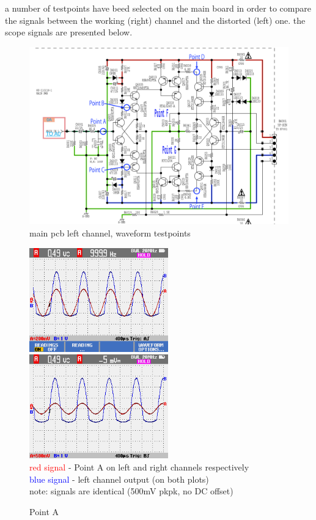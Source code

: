 \documentclass[a4paper,twoside,notitlepage]{article}
\begin{document}
a number of testpoints have beed selected on the main board in order to compare the signals between the working (right) channel and the distorted (left) one. the scope signals are presented below.

\begin{figure}[hptb!]
    \centering
    \includegraphics[width=12cm]{img_report/waveform_testpoints}
 \caption{main pcb left channel, waveform testpoints}
 \label{fig:waveform-testpoints}
\end{figure}

\begin{figure}[hptb!]
    \centering
    \includegraphics[width=6cm]{img_report/left_point_A.png}
    \includegraphics[width=6cm]{img_report/right_point_A.png} \\ 
    \textcolor{Red}{red signal} - Point A on left and right channels respectively \\
    \textcolor{Blue}{blue signal} - left channel output (on both plots) \\
    note: signals are identical (500mV pkpk, no DC offset)
 \caption{Point A}
 \label{fig:point-A}
\end{figure}
\end{document}
